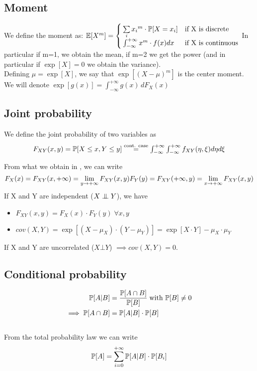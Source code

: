 \subsection{Moment}
We define  the moment as:
$\mathbb{E}[X^m]=
\begin{cases}
    \sum\limits_{i} {x{_i}^{m} \cdot \mathbb{P}[X=x_i]} & \text{if X is discrete } \\
    \int_{-\infty}^{+\infty} {x^{m} \cdot f(x) dx }  & \text{if X is continuous}
\end{cases}$
In particular if m=1, we obtain the mean, if m=2 we get the power (and in particular if $\exp[X]=0$ we obtain the variance).\\
Defining $\mu = \exp[X]$, we say that $\exp[(X-\mu)^m]$ is the center moment.\\
We will denote $\exp[g(x)]=\int_{-\infty}^{+\infty} g(x)\, d F_X(x)$

\subsection{Joint probability}
We define the joint probability of two variables as
\begin{equation*}
  $$F_{XY}(x,y)=\prob[X\le x , Y \le y] \stackrel{\text{cont. case}}{=} \int_{-\infty}^{+\infty}\int_{-\infty}^{+\infty} f_{XY}(\eta,\xi) d\eta d\xi$$
\end{equation*}

From what we obtain in , we can write \\
\begin{equation*}
  $$F_X(x)=F_{XY}(x,+\infty)=\lim\limits_{y \to +\infty} F_{XY}(x,y)$$
  $$F_Y(y)=F_{XY}(+\infty,y)=\lim\limits_{x \to +\infty} F_{XY}(x,y)$$
\end{equation*}
If X and Y are independent ($X \mathrel{\perp\mspace{-10mu}\perp} Y$), we have
\begin{itemize}
  \item $F_{XY}(x,y)=F_X(x)\cdot F_Y(y) \; \forall x,y$
  \item $cov(X,Y) = \exp[(X - \mu_X)\cdot (Y - \mu_Y)] = \exp[X \cdot Y]-\mu_X \cdot \mu_Y$
\end{itemize}
If X and Y are uncorrelated ($X \bot Y$) $\implies cov(X,Y)=0$.

\subsection{Conditional probability}
\begin{equation}
  \begin{split}
    \mathbb{P}[A | B]&= \frac{\mathbb{P}[A \cap B]}{\mathbb{P}[B]} \; \text{with $\mathbb{P}[B]\ne 0$} \\
    \implies \mathbb{P}[A \cap B ] &= \mathbb{P}[A | B ]\cdot \mathbb{P}[B]
  \end{split}
\end{equation}\\
From the total probability law we can write\\
$$\mathbb{P}[A]= \sum\limits_{i=0}^{+\infty}\mathbb{P}[A|B]\cdot \mathbb{P}[B_i]$$

